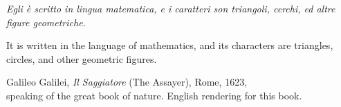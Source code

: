 \thispagestyle{empty}
{}

\vspace*{0.28\textheight}

\begin{center}
\begin{minipage}{0.8\textwidth}
\centering
\itshape
Egli \`e scritto in lingua matematica, e i caratteri son triangoli, cerchi, ed altre figure geometriche.

\medskip
\normalfont
It is written in the language of mathematics, and its characters are triangles, circles, and other geometric figures.

\bigskip
\small
Galileo Galilei, \emph{Il Saggiatore} (The Assayer), Rome, 1623,\\
speaking of the great book of nature. English rendering for this book.
\end{minipage}
\end{center}

\vfill
